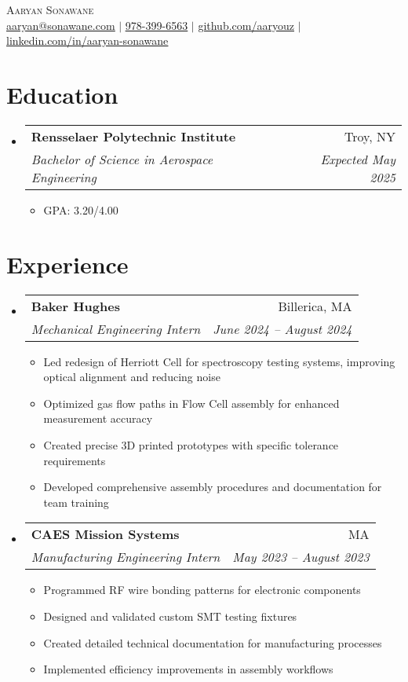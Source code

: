 \documentclass[letterpaper,11pt]{article}
\makeatletter
\newcommand{\resumeItem}[1]{
  \item\small{
    {#1 \vspace{-2pt}}
  }
}
\newcommand{\resumeSubheading}[4]{
  \vspace{-2pt}\item
    \begin{tabular*}{0.97\textwidth}[t]{l@{\extracolsep{\fill}}r}
      \textbf{#1} & #2 \\
      \textit{\small#3} & \textit{\small #4} \\
    \end{tabular*}\vspace{-7pt}
}
\newcommand{\resumeSubHeadingListStart}{\begin{itemize}[leftmargin=0.15in, label={}]}
\newcommand{\resumeSubHeadingListEnd}{\end{itemize}}
\newcommand{\resumeItemListStart}{\begin{itemize}}
\newcommand{\resumeItemListEnd}{\end{itemize}\vspace{-5pt}}
\makeatother
\begin{document}
\begin{center}
    {\Huge \scshape Aaryan Sonawane} \\ \vspace{1pt}
    \small
     \href{mailto:aaryan@sonawane.com}{\underline{aaryan@sonawane.com}} $|$ 
     \href{tel:+9783996563}{\underline{978-399-6563}} $|$
     \href{https://github.com/aaryouz}{\underline{github.com/aaryouz}} $|$
     \href{https://linkedin.com/in/aaryan-sonawane}{\underline{linkedin.com/in/aaryan-sonawane}}
\end{center}

\section{Education}
\resumeSubHeadingListStart
\resumeSubheading
{Rensselaer Polytechnic Institute}{Troy, NY}
{Bachelor of Science in Aerospace Engineering}{Expected May 2025}
\resumeItemListStart
\resumeItem{GPA: 3.20/4.00}
\resumeItemListEnd
\resumeSubHeadingListEnd

\section{Experience}
\resumeSubHeadingListStart

\resumeSubheading
{Baker Hughes}{Billerica, MA}
{Mechanical Engineering Intern}{June 2024 -- August 2024}
\resumeItemListStart
\resumeItem{Led redesign of Herriott Cell for spectroscopy testing systems, improving optical alignment and reducing noise}
\resumeItem{Optimized gas flow paths in Flow Cell assembly for enhanced measurement accuracy}
\resumeItem{Created precise 3D printed prototypes with specific tolerance requirements}
\resumeItem{Developed comprehensive assembly procedures and documentation for team training}
\resumeItemListEnd

\resumeSubheading
{CAES Mission Systems}{MA}
{Manufacturing Engineering Intern}{May 2023 -- August 2023}
\resumeItemListStart
\resumeItem{Programmed RF wire bonding patterns for electronic components}
\resumeItem{Designed and validated custom SMT testing fixtures}
\resumeItem{Created detailed technical documentation for manufacturing processes}
\resumeItem{Implemented efficiency improvements in assembly workflows}
\resumeItemListEnd

\resumeSubHeadingListEnd
\end{document}
